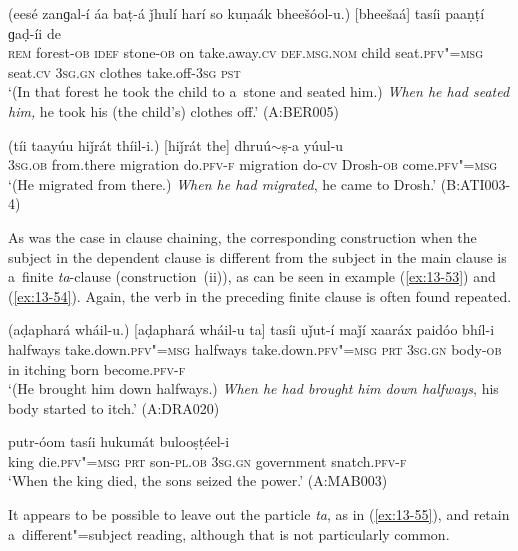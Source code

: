 \begin{exe}
\ex
\label{ex:13-51}
\gll (eesé zanɡal-í áa baṭ-á ǰhulí harí so kuṇaák bheešóol-u.) [bheešaá] tasíi paaṇṭí ɡaḍ-íi de \\
\textsc{rem} forest-\textsc{ob} \textsc{idef} stone-\textsc{ob} on take.away.\textsc{cv}   \textsc{def.msg.nom} child seat.\textsc{pfv"=msg} seat.\textsc{cv} \textsc{3sg.gn} clothes take.off-\textsc{3sg} \textsc{pst} \\
\glt `(In that forest he took the child to a~stone and seated him.) \textit{When he had seated him,} he took his (the child's) clothes off.' (A:BER005)

\ex
\label{ex:13-52}
\gll (tíi taayúu hiǰrát thíil-i.) [hiǰrát the] dhruú$\sim$ṣ-a yúul-u \\
\textsc{3sg.ob} from.there migration do.\textsc{pfv-f}    migration do-\textsc{cv} Drosh-\textsc{ob} come.\textsc{pfv"=msg} \\
\glt `(He migrated from there.) \textit{When he had migrated}, he came to Drosh.' (B:ATI003-4) 
\end{exe}

As was the case in clause chaining, the corresponding construction when the subject in the dependent
clause is different from the subject in the main clause is a~finite \textit{ta}-clause
(construction~(ii)), as can be seen in example (\ref{ex:13-53}) and (\ref{ex:13-54}). Again, the verb in the preceding finite clause is often found repeated.

\begin{exe}
\ex
\label{ex:13-53}
\gll (aḍaphará wháil-u.) [aḍaphará wháil-u ta] tasíi uǰut-í maǰí xaaráx paidóo bhíl-i \\
halfways take.down.\textsc{pfv"=msg} halfways  take.down.\textsc{pfv"=msg } \textsc{prt} \textsc{3sg.gn} body-\textsc{ob} in itching born become.\textsc{pfv-f} \\
\glt `(He brought him down halfways.) \textit{When he had brought him down halfways}, his body started to itch.' (A:DRA020)

\ex
\label{ex:13-54}
 putr-óom tasíi hukumát bulooṣṭéel-i \\
king die.\textsc{pfv"=msg} \textsc{prt} son-\textsc{pl.ob} \textsc{3sg.gn}  government snatch.\textsc{pfv-f} \\
\glt `When the king died, the sons seized the power.' (A:MAB003)
\end{exe}

It appears to be possible to leave out the particle \textit{ta}, as in (\ref{ex:13-55}), and retain a~different"=subject reading, although that is not particularly common.

